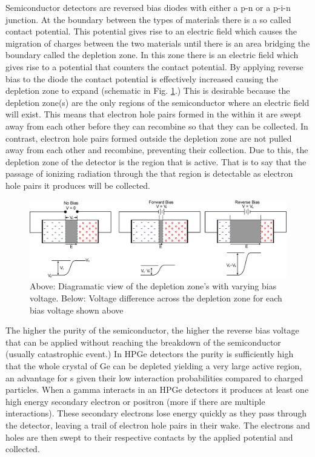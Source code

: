 Semiconductor detectors are reversed bias diodes with either a p-n or a p-i-n junction. At the boundary between the types of materials there is a so called contact potential. This potential gives rise to an electric field which causes the migration of charges between the two materials until there is an area bridging the boundary called the depletion zone. In this zone there is an electric field which gives rise to a potential that counters the contact potential. By applying reverse bias to the diode the contact potential is effectively increased causing the depletion zone to expand (schematic in Fig. \ref{fig:chp3-pn_diode}.) This is desirable because the depletion zone(s) are the only regions of the semiconductor where an electric field will exist. This means that electron hole pairs formed in the within it are swept away from each other before they can recombine so that they can be collected. In contrast, electron hole pairs formed outside the depletion zone are not pulled away from each other and recombine, preventing their collection. Due to this, the depletion zone of the detector is the region that is active. That is to say that the passage of ionizing radiation through the that region is detectable as electron hole pairs it produces will be collected.

\begin{figure}[h!]
	\centerline{\includegraphics[width=\textwidth]{./img/c3/pn-diode.eps}}
	\caption{Above: Diagramatic view of the depletion zone's with varying bias voltage. Below: Voltage difference across the depletion zone for each bias voltage shown above}
	\label{fig:chp3-pn_diode}
\end{figure}

The higher the purity of the semiconductor, the higher the reverse bias voltage that can be applied without reaching the breakdown of the semiconductor (usually catastrophic event.) In HPGe detectors the purity is sufficiently high that the whole crystal of Ge can be depleted yielding a very large active region, an advantage for \gr{}s given their low interaction probabilities compared to charged particles. When a gamma interacts in an HPGe detectors it produces at least one high energy secondary electron or positron (more if there are multiple interactions). These secondary electrons lose energy quickly as they pass through the detector, leaving a trail of electron hole pairs in their wake. The electrons and holes are then swept to their respective contacts by the applied potential and collected.

